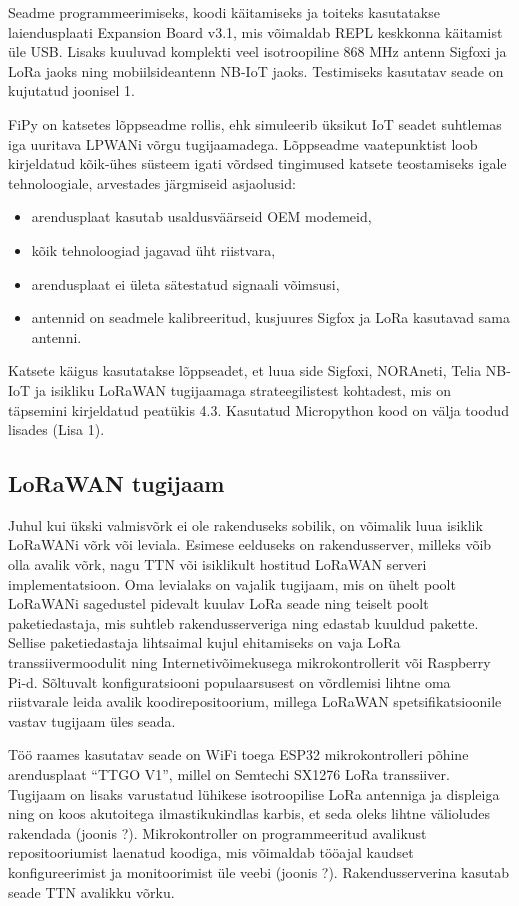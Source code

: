 \documentclass[12pt]{article}
\begin{document}
Seadme programmeerimiseks, koodi käitamiseks ja toiteks kasutatakse laiendusplaati Expansion Board v3.1, mis võimaldab REPL keskkonna käitamist üle USB.
Lisaks kuuluvad komplekti veel isotroopiline 868 MHz antenn Sigfoxi ja LoRa jaoks ning mobiilsideantenn NB-IoT jaoks.
Testimiseks kasutatav seade on kujutatud joonisel 1.

FiPy on katsetes lõppseadme rollis, ehk simuleerib üksikut IoT seadet suhtlemas iga uuritava LPWANi võrgu tugijaamadega.
Lõppseadme vaatepunktist loob kirjeldatud kõik-ühes süsteem igati võrdsed tingimused katsete teostamiseks igale tehnoloogiale, arvestades järgmiseid asjaolusid:
\begin{itemize}
    \item arendusplaat kasutab usaldusväärseid OEM modemeid,
    \item kõik tehnoloogiad jagavad üht riistvara,
    \item arendusplaat ei ületa sätestatud signaali võimsusi,
    \item antennid on seadmele kalibreeritud, kusjuures Sigfox ja LoRa kasutavad sama antenni.
\end{itemize}
Katsete käigus kasutatakse lõppseadet, et luua side Sigfoxi, NORAneti, Telia NB-IoT ja isikliku LoRaWAN tugijaamaga strateegilistest kohtadest, mis on täpsemini kirjeldatud peatükis 4.3.
Kasutatud Micropython kood on välja toodud lisades (Lisa 1).

\subsection{LoRaWAN tugijaam}

Juhul kui ükski valmisvõrk ei ole rakenduseks sobilik, on võimalik luua isiklik LoRaWANi võrk või leviala.
Esimese eelduseks on rakendusserver, milleks võib olla avalik võrk, nagu TTN või isiklikult hostitud LoRaWAN serveri implementatsioon.
Oma levialaks on vajalik tugijaam, mis on ühelt poolt LoRaWANi sagedustel pidevalt kuulav LoRa seade ning teiselt poolt paketiedastaja, mis suhtleb rakendusserveriga ning edastab kuuldud pakette.
Sellise paketiedastaja lihtsaimal kujul ehitamiseks on vaja LoRa transsiivermoodulit ning Internetivõimekusega mikrokontrollerit või Raspberry Pi-d.
Sõltuvalt konfiguratsiooni populaarsusest on võrdlemisi lihtne oma riistvarale leida avalik koodirepositoorium, millega LoRaWAN spetsifikatsioonile vastav tugijaam üles seada.

Töö raames kasutatav seade on WiFi toega ESP32 mikrokontrolleri põhine arendusplaat “TTGO V1”, millel on Semtechi SX1276 LoRa transsiiver.
Tugijaam on lisaks varustatud lühikese isotroopilise LoRa antenniga ja displeiga ning on koos akutoitega ilmastikukindlas karbis, et seda oleks lihtne välioludes rakendada (joonis ?).
Mikrokontroller on programmeeritud avalikust repositooriumist laenatud koodiga, mis võimaldab tööajal kaudset konfigureerimist ja monitoorimist üle veebi (joonis ?).
Rakendusserverina kasutab seade TTN avalikku võrku.
\end{document}
